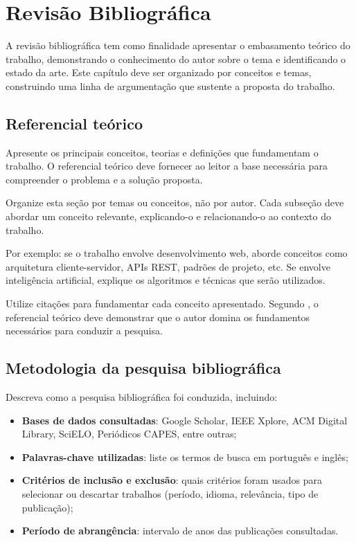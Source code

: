 \documentclass[
    12pt,                %
    openright,           %
    oneside,             %
    a4paper,             %
    english,             %
    brazil               %
]{abntex2}
\begin{document}
\chapter{Revisão Bibliográfica}
\label{cap:revisao}

A revisão bibliográfica tem como finalidade apresentar o embasamento teórico do trabalho, demonstrando o conhecimento do autor sobre o tema e identificando o estado da arte. Este capítulo deve ser organizado por conceitos e temas, construindo uma linha de argumentação que sustente a proposta do trabalho.

\section{Referencial teórico}
\label{sec:referencial}

Apresente os principais conceitos, teorias e definições que fundamentam o trabalho. O referencial teórico deve fornecer ao leitor a base necessária para compreender o problema e a solução proposta.

Organize esta seção por temas ou conceitos, não por autor. Cada subseção deve abordar um conceito relevante, explicando-o e relacionando-o ao contexto do trabalho.

Por exemplo: se o trabalho envolve desenvolvimento web, aborde conceitos como arquitetura cliente-servidor, APIs REST, padrões de projeto, etc. Se envolve inteligência artificial, explique os algoritmos e técnicas que serão utilizados.

Utilize citações para fundamentar cada conceito apresentado. Segundo , o referencial teórico deve demonstrar que o autor domina os fundamentos necessários para conduzir a pesquisa.

\section{Metodologia da pesquisa bibliográfica}
\label{sec:metodologia_pesquisa}

Descreva como a pesquisa bibliográfica foi conduzida, incluindo:

\begin{itemize}
    \item \textbf{Bases de dados consultadas}: Google Scholar, IEEE Xplore, ACM Digital Library, SciELO, Periódicos CAPES, entre outras;
    \item \textbf{Palavras-chave utilizadas}: liste os termos de busca em português e inglês;
    \item \textbf{Critérios de inclusão e exclusão}: quais critérios foram usados para selecionar ou descartar trabalhos (período, idioma, relevância, tipo de publicação);
    \item \textbf{Período de abrangência}: intervalo de anos das publicações consultadas.
\end{itemize}
\end{document}
